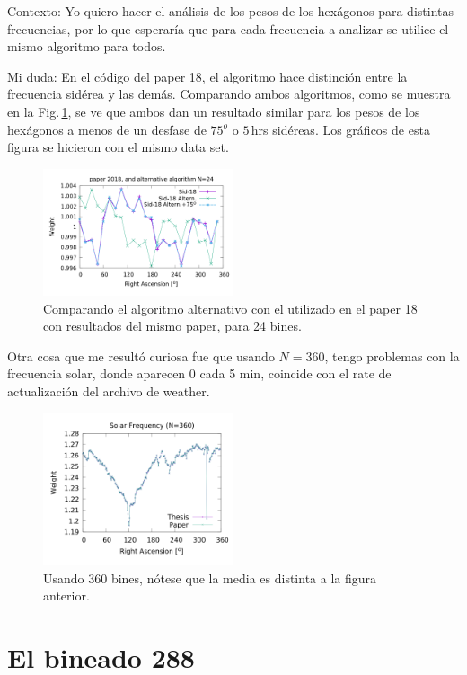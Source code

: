 Contexto: Yo quiero hacer el análisis de los pesos de los hexágonos para distintas frecuencias, por lo que esperaría que para cada frecuencia a analizar se utilice el mismo algoritmo para todos.

Mi duda: En el código del paper 18, el algoritmo hace distinción entre la frecuencia sidérea y las demás. Comparando ambos algoritmos, como se muestra en la Fig.\,\ref{fig:alter_24}, se ve que ambos dan un resultado similar para los pesos de los hexágonos a menos de un desfase de $75^o$ o $5\,$hrs sidéreas. Los gráficos de esta figura se hicieron con el mismo data set.

\begin{figure}[H]
	\centering
	\includegraphics[width=0.5\textwidth]{sidereal_paper_in_24_w_alter.png}
	\caption{Comparando el algoritmo alternativo con el utilizado en el paper 18 con resultados del mismo paper, para 24 bines.}
	\label{fig:alter_24}
\end{figure}


Otra cosa que me resultó curiosa fue que usando $N=360$, tengo problemas con la frecuencia solar, donde aparecen 0 cada 5 min, coincide con el rate de actualización del archivo de weather. 
\begin{figure}[H]
	\centering
	\includegraphics[width=0.5\textwidth]{solar_my_and_paper_in_360_2.png}
	\caption{Usando 360 bines, nótese que la media es distinta a la figura anterior.}
	\label{fig:solar_360}
\end{figure}

\section{El bineado 288}

